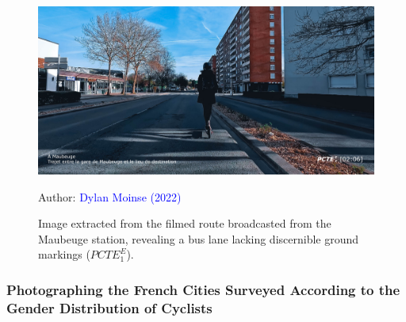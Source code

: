 \begin{refsegment}
\begin{figure}[h!]\vspace*{4pt}
    \caption{Image extracted from the filmed route broadcasted from the Maubeuge station, revealing a bus lane lacking discernible ground markings (\(PCTE^{E}_{1}\)).}
    \label{fig-chap4:pcte1e-voie-bus}
    \centerline{\includegraphics[width=1\columnwidth]{src/Figures/Chap-4/Extrait_Video_PCTE1_Egress_4.jpg}}
    \vspace{5pt}
    \begin{flushright}\scriptsize{
    Author: \textcolor{blue}{Dylan Moinse (2022)}
    }\end{flushright}
\end{figure}

\subsubsection*{Photographing the French Cities Surveyed According to the Gender Distribution of Cyclists
    \label{chap4:comparaison-villes-fr-genre}
    }


\end{refsegment}
